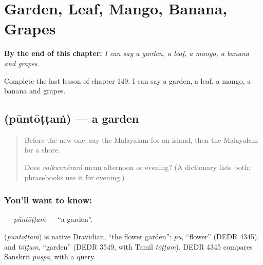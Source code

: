 
\chapter{Garden, Leaf, Mango, Banana, Grapes}
\label{ch:ml-garden-leaf-mango-banana-grapes}

\begin{chapteropening}
\textbf{By the end of this chapter:} \emph{I can say a garden, a leaf, a mango, a banana and grapes.}

Complete the last lesson of chapter 149: I can say a garden, a leaf, a mango, a banana and grapes.
\end{chapteropening}

\section[\texorpdfstring{\ml{പൂന്തോട്ടം} (pūntōṭṭaṁ)}{പൂന്തോട്ടം (pūntōṭṭaṁ)}]{ (pūntōṭṭaṁ) — a garden}

\label{lesson:ML-C149-puntottam}



\begin{quote}
Before the new one: say the Malayalam for an island, then the Malayalam for a shore.

Does \emph{vaikunnēraṁ} mean afternoon or evening? (A dictionary lists both; phrasebooks use it for evening.)
\end{quote}

\subsection*{You'll want to know: }
\textbf{} — \emph{pūntōṭṭaṁ} — \textquotedblleft{}a garden\textquotedblright{}.

\begin{cousinweb}
\textbf{} (\emph{pūntōṭṭaṁ}) is native Dravidian, \textquotedblleft{}the flower garden\textquotedblright{}: \emph{pū}, \textquotedblleft{}flower\textquotedblright{} (DEDR 4345), and \emph{tōṭṭam}, \textquotedblleft{}garden\textquotedblright{} (DEDR 3549, with Tamil \emph{tōṭṭam}). DEDR 4345 compares Sanskrit \emph{puṣpa}, with a query.
\end{cousinweb}


